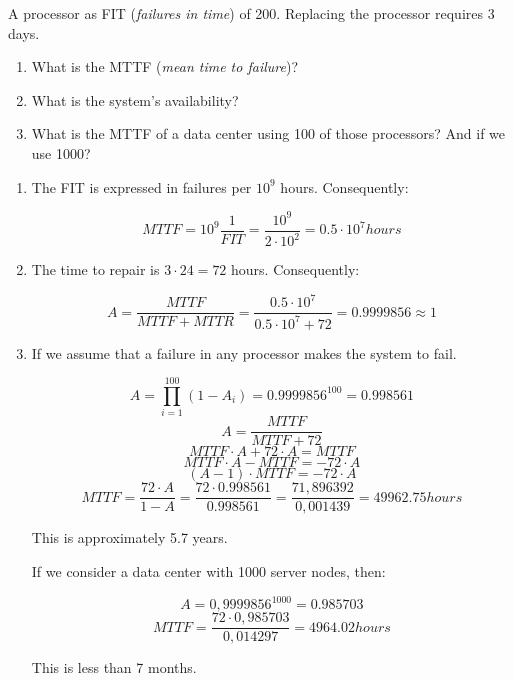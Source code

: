 \begin{acexercise}\end{acexercise}

A processor as FIT (\emph{failures in time}) of 200. Replacing the processor requires 3 days.

\begin{enumerate}

\item What is the MTTF (\emph{mean time to failure})?

\item What is the system's availability?

\item What is the MTTF of a data center using 100 of those processors? And if we use 1000?

\end{enumerate}

\begin{acsolution}\end{acsolution}

\begin{enumerate}

\item The FIT is expressed in failures per $10^9$ hours. Consequently:

\[MTTF = 10^9 \frac{1}{FIT} = \frac{10^9}{2 \cdot 10^2} = 0.5 \cdot 10^7 hours\]

\item The time to repair is $3 \cdot 24 = 72$ hours. Consequently:

\[
A = \frac{MTTF}{MTTF + MTTR} =
\frac{0.5 \cdot 10^7}{0.5 \cdot 10^7 + 72} =
0.9999856 \approx 1
\]

\item If we assume that a failure in any processor makes the system to fail.

\[
A = \prod_{i=1}^{100}(1 - A_i) = 0.9999856^{100} = 0.998561
\]
\[A = \frac{MTTF}{MTTF + 72} \]
\[MTTF \cdot A + 72 \cdot A = MTTF\]
\[MTTF \cdot A - MTTF = - 72 \cdot A\]
\[(A-1) \cdot MTTF = - 72 \cdot A\]
\[MTTF = \frac{72 \cdot A}{1 - A} = \frac{72 \cdot 0.998561}{0.998561} =
\frac{71,896392}{0,001439} =
49962.75 hours
\]

This is approximately 5.7 years.

If we consider a data center with 1000 server nodes, then:

\[A = 0,9999856^{1000} = 0.985703\]
\[MTTF = \frac{72 \cdot 0,985703}{0,014297} = 4964.02 hours\]

This is less than 7 months.

\end{enumerate}
